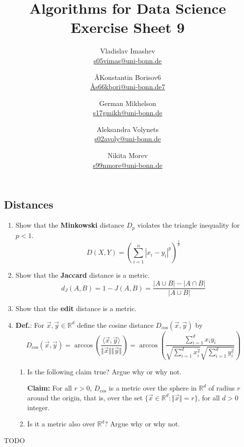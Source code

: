 \documentclass{article}
\title{Algorithms for Data Science \\ Exercise Sheet 9}
\author{
  Vladislav Imashev \\ \href{mailto:s05vimas@uni-bonn.de}{s05vimas@uni-bonn.de} \and
  \AA{Konstantin Borisov}{6} \\ \href{mailto:\AA{s66kbori@uni-bonn.de}{7}}{\AA{s66kbori@uni-bonn.de}{7}} \and
  German Mikhelson \\ \href{mailto:s17gmikh@uni-bonn.de}{s17gmikh@uni-bonn.de} \and
  Aleksandra Volynets \\ \href{mailto:s02avoly@uni-bonn.de}{s02avoly@uni-bonn.de} \and
  Nikita Morev \\ \href{mailto:s99nmore@uni-bonn.de}{s99nmore@uni-bonn.de}
}
\newcommand{\R}{\mathbb{R}}
\begin{document}
  \maketitle

  \setcounter{section}{9}
  \subsection{Distances}
  \begin{centerframebox}
    \begin{enumerate}[label=(\roman*)]
      \item Show that the \textbf{Minkowski} distance $D_p$ violates the triangle inequality for $p < 1$.
      \[ D\left(X,Y\right) = \left(\sum_{i=1}^n |x_i-y_i|^p\right)^{\frac{1}{p}} \]
      \item Show that the \textbf{Jaccard} distance is a metric.
      \[ d_J(A,B) = 1 - J(A,B) = \frac{|A \cup B| - |A \cap B|}{|A \cup B|} \]
      \item Show that the \textbf{edit} distance is a metric.

      \item \textbf{Def.}: For $\vec{x},\vec{y}\in \R^d$ define the cosine distance
      $D_{\cos}(\vec{x}, \vec{y})$ by
      \[ D_{\cos}(\vec{x},\vec{y}) =
      \arccos\left(\frac{\langle\vec{x},\vec{y}\rangle}{\Vert{\vec{x}}\Vert\Vert{\vec{y}}\Vert}\right) =
      \arccos\left(\frac{\sum_{i=1}^{d}x_{i}y_{i}}{\sqrt{\sum_{i=1}^{d}x_{i}^{2}}\sqrt{\sum_{i=1}^{d}y_{i}^{2}}}\right) \]

      \begin{enumerate}
        \item  Is the following claim true? Argue why or why not.

        \textbf{Claim:} For all $r > 0$, $D_{\cos}$ is a metric over the sphere in $\R^d$ of radius $r$ around the origin,
        that is, over the set $\{\vec{x} \in \R^d : \Vert\vec{x}\Vert = r \}$,
        for all $d > 0$ integer.
        \item Is it a metric also over $\R^d$? Argue why or why not.
      \end{enumerate}
    \end{enumerate}
  \end{centerframebox}
  TODO %
\end{document}
